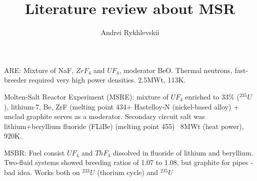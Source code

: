 \documentclass[a4paper,10pt]{article}
\title{Literature review about MSR}
\author{Andrei Rykhlevskii}
\begin{document}
\maketitle

ARE: Mixture of NaF, $ZrF_4$ and $UF_4$, moderator BeO.  Thermal neutrons, fast-breeder required very high power densities. 2.5MWt, 113K. \cite{msrhistory}

Molten-Salt Reactor Experiment (MSRE): mixture of $UF_4$ enriched to 33\% ($^{235}U$), lithium-7, Be, ZrF (melting point 434\celsius + Hastelloy-N (nickel-based alloy) + unclad graphite serves as a moderator. Secondary circuit salt was lithium+beryllium fluoride (FLiBe) (melting point 455\celsius) ~8MWt (heat power), 920K.

MSBR: Fuel consist $UF_4$ and $ThF_4$ dissolved in fluoride of lithium and beryllium. Two-fluid systems showed breeding ratios of 1.07 to 1.08, but graphite for pipes - bad idea. Works both on $^{233}U$ (thorium cycle) and $^{235}U$
 \cite{msrhistory}

\medskip


\end{document}
